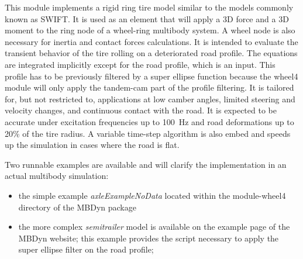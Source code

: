 \noindent
This module implements a rigid ring tire model similar to the models commonly known as SWIFT. It is used as an element that will apply a 3D force and a 3D moment to the ring node of a wheel-ring multibody system. A wheel node is also necessary for inertia and contact forces calculations. It is intended to evaluate the transient behavior of the tire rolling on a deteriorated road profile. The equations are integrated implicitly except for the road profile, which is an input. This profile has to be previously filtered by a super ellipse function because the wheel4 module will only apply the tandem-cam part of the profile filtering. It is tailored for, but not restricted to, applications at low camber angles, limited steering and velocity changes, and continuous contact with the road. It is expected to be accurate under excitation frequencies up to 100~Hz and road deformations up to 20\% of the tire radius. A variable time-step algorithm is also embed and speeds up the simulation in cases where the road is flat.

Two runnable examples are available and will clarify the implementation in an actual multibody simulation:
\begin{itemize}
\item the simple example \textit{axleExampleNoData} located within the module-wheel4 directory of the MBDyn package
\item the more complex \textit{semitrailer} model is available on the example page of the MBDyn website; this example provides the script necessary to apply the super ellipse filter on the road profile; 
\end{itemize}

